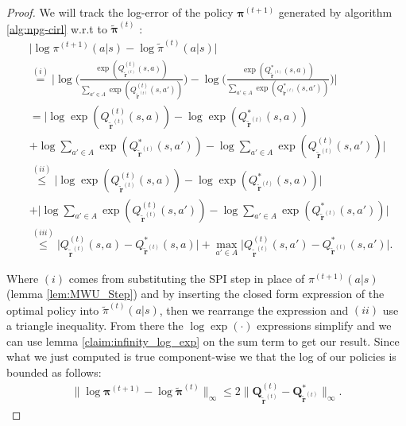 \begin{proof}
    We will track the log-error of the policy $\bm{\pi}^{(t+1)}$ generated by algorithm \ref{alg:npg-cirl} w.r.t to $\tilde{\bm{\pi}}^{(t)}$ :
\begin{align*}
    &\big| \log {\pi}^{(t+1)}(a|s) - \log \tilde{{\pi}}^{(t)}(a|s) \big|\\
    &\stackrel{(i)}{=} 
    \Bigg| 
        \log \Bigg(\frac{
            \exp(Q^{(t)}_{\tilde{\bm{r}}^{(t)}} (s,a) )
        }{
            \sum_{a' \in A} 
            \exp(Q^{(t)}_{\tilde{\bm{r}}^{(t)}} (s,a') )
        } \Bigg) -
        \log \Bigg(\frac{
            \exp(Q^*_{\tilde{\bm{r}}^{(t)}} (s,a) )
        }{
            \sum_{a' \in A} 
            \exp(Q^*_{\tilde{\bm{r}}^{(t)}} (s,a') )
        } \Bigg)  
    \Bigg| \\
    &=
    \Bigg| 
        \log \exp(Q^{(t)}_{\tilde{\bm{r}}^{(t)}} (s,a) )
        -
        \log \exp(Q^*_{\tilde{\bm{r}}^{(t)}} (s,a) )\\ &
        + \log  \sum_{a' \in A} \exp(Q^*_{\tilde{\bm{r}}^{(t)}} (s,a') )
        - \log  \sum_{a' \in A} \exp(Q^{(t)}_{\tilde{\bm{r}}^{(t)}} (s,a') )
    \Bigg| \\
    &\stackrel{(ii)}{\leq} 
    \Bigg| 
    \log \exp(Q^{(t)}_{\tilde{\bm{r}}^{(t)}} (s,a) )
    - \log \exp(Q^*_{\tilde{\bm{r}}^{(t)}} (s,a) )
    \Bigg| \\ &
    +
    \Bigg| 
        \log  \sum_{a' \in A} \exp(Q^{(t)}_{\tilde{\bm{r}}^{(t)}} (s,a') )
        - \log  \sum_{a' \in A} \exp(Q^*_{\tilde{\bm{r}}^{(t)}} (s,a') )
    \Bigg| \\
    &\stackrel{(iii)}{\leq} 
    \Bigg| 
     Q^{(t)}_{\tilde{\bm{r}}^{(t)}} (s,a) 
    - Q^*_{\tilde{\bm{r}}^{(t)}} (s,a) 
    \Bigg| 
    + \max_{a'\in A}
    \Bigg| 
        Q^{(t)}_{\tilde{\bm{r}}^{(t)}} (s,a') -
        Q^*_{\tilde{\bm{r}}^{(t)}} (s,a') 
    \Bigg|.
\end{align*}

Where $(i)$ comes from substituting the SPI step in place of ${\pi}^{(t+1)}(a|s)$ (lemma \ref{lem:MWU_Step}) and by inserting the closed form expression of the optimal policy into $\tilde{{\pi}}^{(t)}(a|s)$, then we rearrange the expression and $(ii)$ use a triangle inequality. From there the $\log \exp (\cdot)$ expressions simplify and we can use lemma \ref{claim:infinity_log_exp} on the sum term to get our result. Since what we just computed is true component-wise we that the log of our policies is bounded as follows:
\begin{align*}
    \| \log \bm{\pi}^{(t+1)} - \log \tilde{\bm{\pi}}^{(t)} \|_\infty 
    \leq
    2 \|\bm{Q}^{(t)}_{\tilde{\bm{r}}^{(t)}}- \bm{Q}^*_{\tilde{\bm{r}}^{(t)}} \|_\infty.
\end{align*}


\end{proof}
